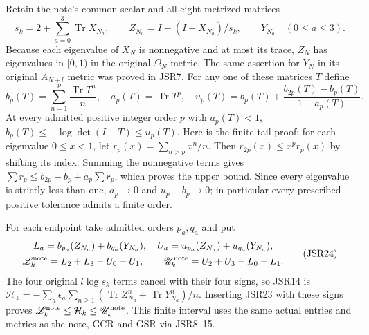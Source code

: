 \documentclass[11pt,a4paper]{article}
\newcommand{\Tr}{\operatorname{Tr}}
\begin{document}
Retain the note's common scalar and all eight metrized matrices
\[
 s_k=2+\sum_{a=0}^3\Tr X_{N_a},\qquad
 Z_{N_a}=I-(I+X_{N_a})/s_k,
 \qquad Y_{N_a}\quad(0\leq a\leq3).
 \tag{JSR22}
\]
Because each eigenvalue of $X_N$ is nonnegative and at
most its trace, $Z_N$ has eigenvalues in $[0,1)$ in
the original $\Omega_N$ metric. The same assertion for
$Y_N$ in its original $A_{N+l}$ metric was proved in JSR7.
For any one of these matrices $T$ define
\[
 b_p(T)=\sum_{n=1}^p\frac{\Tr T^n}{n},\quad
 a_p(T)=\Tr T^p,\quad
 u_p(T)=b_p(T)+\frac{b_{2p}(T)-b_p(T)}{1-a_p(T)}.
 \tag{JSR23}
\]
At every admitted positive integer order $p$ with $a_p(T)<1$,
$b_p(T)\leq-\log\det(I-T)\leq u_p(T)$.
Here is the finite-tail proof: for each eigenvalue
$0\leq x<1$, let $r_p(x)=\sum_{n>p}x^n/n$.
Then $r_{2p}(x)\leq x^pr_p(x)$ by shifting its index.
Summing the nonnegative terms gives
$\sum r_p\leq b_{2p}-b_p+a_p\sum r_p$,
which proves the upper bound. Since every eigenvalue is
strictly less than one, $a_p\to0$ and $u_p-b_p\to0$;
in particular every prescribed positive tolerance admits
a finite order.

For each endpoint take admitted orders $p_a,q_a$ and put
\[
\begin{gathered}
 L_a=b_{p_a}(Z_{N_a})+b_{q_a}(Y_{N_a}),\quad
 U_a=u_{p_a}(Z_{N_a})+u_{q_a}(Y_{N_a}),\\
 \mathscr L_k^{\rm note}=L_2+L_3-U_0-U_1,\qquad
 \mathscr U_k^{\rm note}=U_2+U_3-L_0-L_1.
\end{gathered}\tag{JSR24}
\]
The four original $l\log s_k$ terms cancel with their
four signs, so JSR14 is
$\mathcal H_k=-\sum_a\epsilon_a
\sum_{n\geq1}(\Tr Z_{N_a}^n+\Tr Y_{N_a}^n)/n$.
Inserting JSR23 with these signs proves
$\mathscr L_k^{\rm note}\leq\mathcal H_k
\leq\mathscr U_k^{\rm note}$.
This finite interval uses the same actual entries and
metrics as the note, GCR and GSR via JSR8--15.
\end{document}

